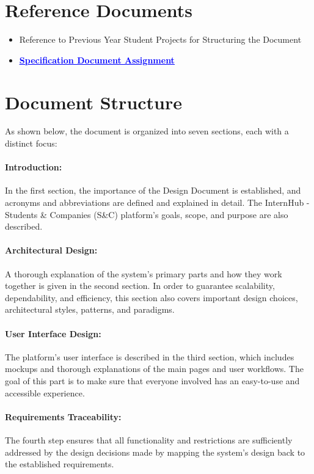 \section{Reference Documents}
\label{sec:reference_documents}%
\begin{itemize}
    \item Reference to Previous Year Student Projects for Structuring the Document
    \item \href{https://github.com/JhaBhatiaSharma/JhaBhatiaSharma/tree/main/RASD\%20Doc}{\textbf{\textcolor{blue}{\underline{Specification Document Assignment}}}}
\end{itemize}

\section{Document Structure}
\label{sec:document_structure}%
As shown below, the document is organized into seven sections, each with a distinct focus:

\paragraph{Introduction:} In the first section, the importance of the Design Document is established, and acronyms and abbreviations are defined and explained in detail. The InternHub - Students \& Companies (S\&C) platform's goals, scope, and purpose are also described.

\paragraph{Architectural Design:} A thorough explanation of the system's primary parts and how they work together is given in the second section. In order to guarantee scalability, dependability, and efficiency, this section also covers important design choices, architectural styles, patterns, and paradigms.

\paragraph{User Interface Design:} The platform's user interface is described in the third section, which includes mockups and thorough explanations of the main pages and user workflows. The goal of this part is to make sure that everyone involved has an easy-to-use and accessible experience.

\paragraph{Requirements Traceability:} The fourth step ensures that all functionality and restrictions are sufficiently addressed by the design decisions made by mapping the system's design back to the established requirements.

